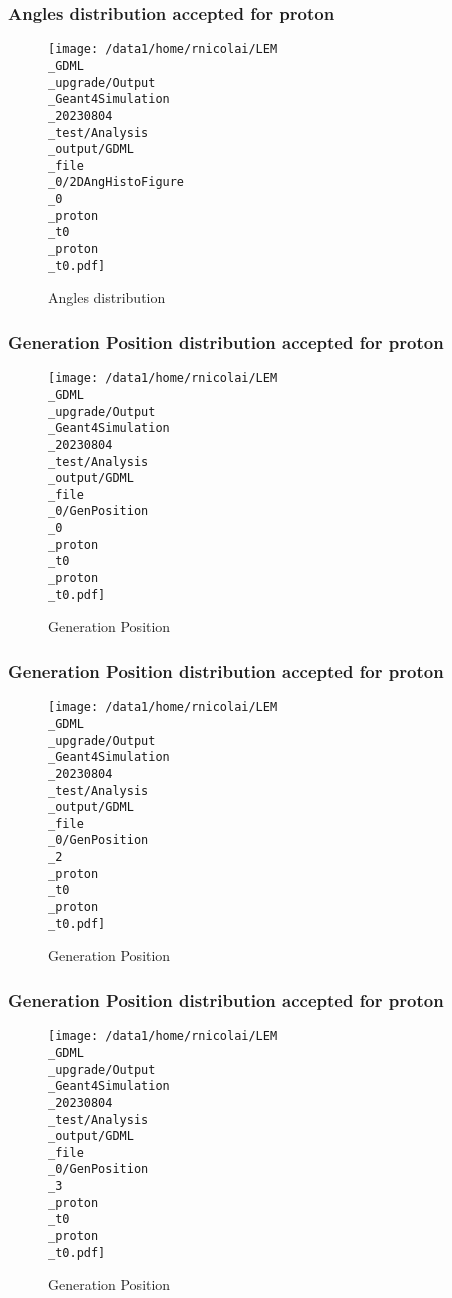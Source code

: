 \documentclass[8pt]{beamer}
\begin{document}
            \begin{frame}
                \frametitle{Angles distribution accepted for proton}
            
        \begin{figure}[h]
            \centering
            \texttt{[image: /data1/home/rnicolai/LEM\\\_GDML\\\_upgrade/Output\\\_Geant4Simulation\\\_20230804\\\_test/Analysis\\\_output/GDML\\\_file\\\_0/2DAngHistoFigure\\\_0\\\_proton\\\_t0\\\_proton\\\_t0.pdf]}
            \caption{Angles distribution}
        \end{figure}
        
            \end{frame}
            
            \begin{frame}
                \frametitle{Generation Position distribution accepted for proton}
            
        \begin{figure}[h]
            \centering
            \texttt{[image: /data1/home/rnicolai/LEM\\\_GDML\\\_upgrade/Output\\\_Geant4Simulation\\\_20230804\\\_test/Analysis\\\_output/GDML\\\_file\\\_0/GenPosition\\\_0\\\_proton\\\_t0\\\_proton\\\_t0.pdf]}
            \caption{Generation Position}
        \end{figure}
        
            \end{frame}
            
            \begin{frame}
                \frametitle{Generation Position distribution accepted for proton}
            
        \begin{figure}[h]
            \centering
            \texttt{[image: /data1/home/rnicolai/LEM\\\_GDML\\\_upgrade/Output\\\_Geant4Simulation\\\_20230804\\\_test/Analysis\\\_output/GDML\\\_file\\\_0/GenPosition\\\_2\\\_proton\\\_t0\\\_proton\\\_t0.pdf]}
            \caption{Generation Position}
        \end{figure}
        
            \end{frame}
            
            \begin{frame}
                \frametitle{Generation Position distribution accepted for proton}
            
        \begin{figure}[h]
            \centering
            \texttt{[image: /data1/home/rnicolai/LEM\\\_GDML\\\_upgrade/Output\\\_Geant4Simulation\\\_20230804\\\_test/Analysis\\\_output/GDML\\\_file\\\_0/GenPosition\\\_3\\\_proton\\\_t0\\\_proton\\\_t0.pdf]}
            \caption{Generation Position}
        \end{figure}
        
            \end{frame}
            
\end{document}
